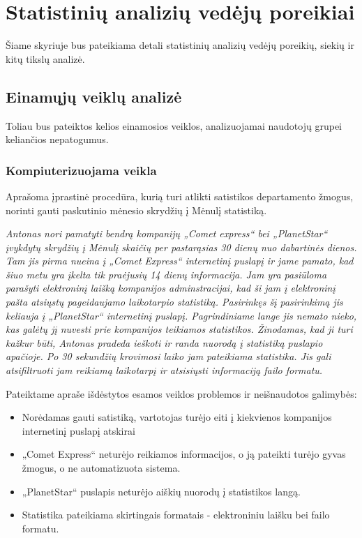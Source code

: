 \documentclass{VUMIFPSkursinis}
\begin{document}
\section{Statistinių analizių vedėjų poreikiai}
Šiame skyriuje bus pateikiama detali statistinių analizių vedėjų poreikių, siekių ir kitų tikslų analizė.

\subsection{Einamųjų veiklų analizė}
Toliau bus pateiktos kelios einamosios veiklos, analizuojamai naudotojų grupei keliančios nepatogumus.

\subsubsection{Kompiuterizuojama veikla}
Aprašoma įprastinė procedūra, kurią turi atlikti satistikos departamento žmogus, norinti gauti paskutinio mėnesio skrydžių į Mėnulį statistiką.

\bigskip
\textit{Antonas nori pamatyti bendrą kompanijų „Comet express“ bei „PlanetStar“ įvykdytų skrydžių į Mėnulį skaičių per pastarąsias 30 dienų nuo dabartinės dienos. Tam jis pirma nueina į „Comet Express“ internetinį puslapį ir jame pamato, kad šiuo metu yra įkelta tik praėjusių 14 dienų informacija. Jam yra pasiūloma parašyti elektroninį laišką kompanijos adminstracijai, kad ši jam į elektroninį pašta atsiųstų pageidaujamo laikotarpio statistiką. Pasirinkęs šį pasirinkimą jis keliauja į „PlanetStar“ internetinį puslapį. Pagrindiniame lange jis nemato nieko, kas galėtų jį nuvesti prie kompanijos teikiamos statistikos. Žinodamas, kad ji turi kažkur būti, Antonas pradeda ieškoti ir randa nuorodą į statistiką puslapio apačioje. Po 30 sekundžių krovimosi laiko jam pateikiama statistika. Jis gali atsifiltruoti jam reikiamą laikotarpį ir atsisiųsti informaciją failo formatu.}

\bigskip
Pateiktame apraše išdėstytos esamos veiklos problemos ir neišnaudotos galimybės:  
\begin{itemize}
\item Norėdamas gauti satistiką, vartotojas turėjo eiti į kiekvienos kompanijos internetinį puslapį atskirai
\item „Comet Express“ neturėjo reikiamos informacijos, o ją pateikti turėjo gyvas žmogus, o ne automatizuota sistema.
\item „PlanetStar“ puslapis neturėjo aiškių nuorodų į statistikos langą.
\item Statistika pateikiama skirtingais formatais - elektroniniu laišku bei failo formatu.
\end{itemize}
\end{document}
